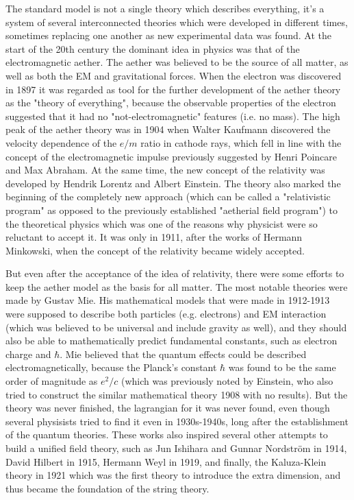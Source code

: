 The standard model is not a single theory which describes everything, it's a system of several interconnected theories which were developed in different times, sometimes replacing one another as new experimental data was found. At the start of the 20th century the dominant idea in physics was that of the electromagnetic aether. The aether was believed to be the source of all matter, as well as both the EM and gravitational forces. When the electron was discovered in 1897 it was regarded as tool for the further development of the aether theory as the "theory of everything", because the observable properties of the electron suggested that it had no "not-electromagnetic" features (i.e. no mass). The high peak of the aether theory was in 1904 when Walter Kaufmann discovered the velocity dependence of the $e/m$ ratio in cathode rays, which fell in line with the concept of the electromagnetic impulse previously suggested by Henri Poincare and Max Abraham. At the same time, the new concept of the relativity was developed by Hendrik Lorentz and Albert Einstein. The theory also marked the beginning of the completely new approach (which can be called a "relativistic program" as opposed to the previously established "aetherial field program") to the theoretical physics which was one of the reasons why physicist were so reluctant to accept it. It was only in 1911, after the works of Hermann Minkowski, when the concept of the relativity became widely accepted.

But even after the acceptance of the idea of relativity, there were some efforts to keep the aether model as the basis for all matter. The most notable theories were made by Gustav Mie. His mathematical models that were made in 1912-1913 were supposed to describe both particles (e.g. electrons) and EM interaction (which was believed to be universal and include gravity as well), and they should also be able to mathematically predict fundamental constants, such as electron charge and $\hbar$. Mie believed that the quantum effects could be described electromagnetically, because the Planck's constant $\hbar$ was found to be the same order of magnitude as $e^{2}/c$ (which was previously noted by Einstein, who also tried to construct the similar mathematical theory 1908 with no results). But the theory was never finished, the lagrangian for it was never found, even though several physisists tried to find it even in 1930s-1940s, long after the establishment of the quantum theories. These works also inspired several other attempts to build a unified field theory, such as Jun Ishihara and Gunnar Nordstr{\"o}m in 1914, David Hilbert in 1915, Hermann Weyl in 1919, and finally, the Kaluza-Klein theory in 1921 which was the first theory to introduce the extra dimension, and thus became the foundation of the string theory.

